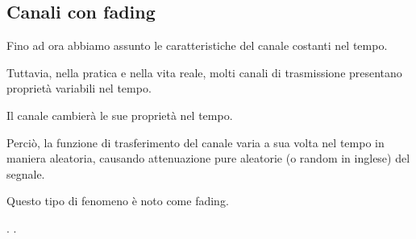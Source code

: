 \subsection{Canali con fading}

Fino ad ora abbiamo assunto le caratteristiche del canale costanti nel tempo. \newline 

Tuttavia, nella pratica e nella vita reale, molti canali di trasmissione presentano proprietà variabili nel tempo. \newline 

Il canale cambierà le sue proprietà nel tempo. \newline

Perciò, la funzione di trasferimento del canale varia a sua volta nel tempo in maniera aleatoria, causando attenuazione pure aleatorie 
(o random in inglese) del segnale. \newline 

Questo tipo di fenomeno è noto come fading. \newline 

\newpage 
.
\newpage
. 
\newpage

